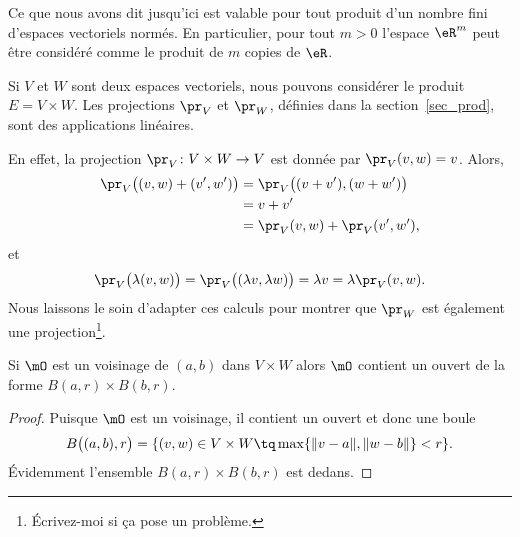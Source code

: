 Ce que nous avons dit jusqu'ici est valable pour tout produit d'un nombre fini d'espaces vectoriels normés. En particulier, pour tout \( m>0\)  l'espace  \( \eR^m\) peut être considéré comme le produit de \( m\) copies de \( \eR\).

\begin{example}
	Si \( V\) et \( W\) sont deux espaces vectoriels, nous pouvons considérer le produit \( E=V\times W\). Les projections \( \pr_V\) et \( \pr_W\), définies dans la section~\ref{sec_prod}, sont des applications linéaires.

	En effet, la projection \( \pr_V\colon V\times W\to V\) est donnée par \( \pr_V(v,w)=v\). Alors,
	\begin{equation}
		\begin{aligned}[]
			\pr_V\big( (v,w)+(v',w') \big) & =\pr_V\big( (v+v'),(w+w') \big) \\
			                               & =v+v'                           \\
			                               & =\pr_V(v,w)+\pr_V(v',w'),
		\end{aligned}
	\end{equation}
	et
	\begin{equation}
		\pr_V\big( \lambda(v,w) \big)=\pr_V\big( (\lambda v,\lambda w) \big)=\lambda v=\lambda\pr_V(v,w).
	\end{equation}
	Nous laissons  le soin d'adapter ces calculs pour montrer que \( \pr_W\) est également une projection\footnote{Écrivez-moi si ça pose un problème.}.
\end{example}

\begin{proposition} \label{PropDXR_KbaLC}
	Si \( \mO\) est un voisinage de \( (a,b)\) dans \( V\times W\) alors \( \mO\) contient un ouvert de la forme \( B(a,r)\times B(b,r)\).
\end{proposition}

\begin{proof}
	Puisque \( \mO\) est un voisinage, il contient un ouvert et donc une boule
	\begin{equation}
		B\big( (a,b),r \big)=\{ (v,w)\in V\times W\tq \max\{ \| v-a \|,\| w-b \| \}< r \}.
	\end{equation}
	Évidemment l'ensemble \( B(a,r)\times B(b,r)\) est dedans.
\end{proof}



